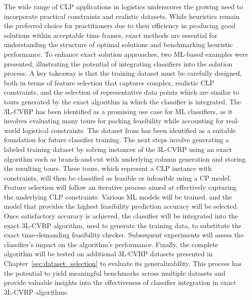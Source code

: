 The wide range of \gls{CLP} applications in logistics underscores the growing need to incorporate practical
constraints and realistic datasets. While heuristics remain the preferred choice for practitioners due to
their efficiency in producing good solutions within acceptable time frames, exact methods are essential for
understanding the structure of optimal solutions and benchmarking heuristic performance.
To enhance exact solution approaches, two \gls{ML}-based examples were presented, illustrating the potential
of integrating classifiers into the solution process. A key takeaway is that the training dataset must be
carefully designed, both in terms of feature selection that captures complex, realistic \gls{CLP} constraints,
and the selection of representative data points which are similar to tours generated by the exact algorithm
in which the classifier is integrated. The \gls{3L-CVRP} has been identified as a promising use case for \gls{ML} classifiers, as
it involves evaluating many tours for packing feasibility while accounting for real-world logistical
constraints. The dataset from \krebsADataSetText has been identified as a suitable foundation
for future classifier training. The next steps involve generating a labeled training dataset by solving
instances of the \gls{3L-CVRP} using an exact algorithm such as branch-and-cut with underlying column generation and storing the resulting tours.
These tours, which represent a \gls{CLP} instance with constraints, will then be classified as feasible or
infeasible using a \gls{CP} model. Feature selection will follow an iterative process aimed at effectively
capturing the underlying \gls{CLP} constraints. Various \gls{ML} models will be trained, and the model that
provides the highest feasibility prediction accuracy will be selected. Once satisfactory accuracy is achieved,
the classifier will be integrated into the exact \gls{3L-CVRP} algorithm, used to generate the training data,
to substitute the exact time-demanding feasibility checker.
Subsequent experiments will assess the classifier’s impact on the algorithm’s performance. Finally, the complete
algorithm will be tested on additional \gls{3L-CVRP} datasets presented in Chapter~\ref{sec:dataset_selection}
to evaluate its generalizability. This process has the potential to yield meaningful benchmarks across
multiple datasets and provide valuable insights into the effectiveness of classifier integration in exact \gls{3L-CVRP} algorithms.